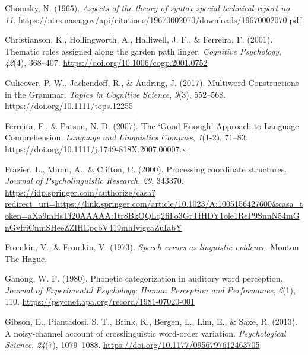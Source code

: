 \documentclass[
  12pt,
]{scrartcl}
\newlength{\cslhangindent}
\newenvironment{CSLReferences}[2] %
 {\begin{list}{}{%
  \setlength{\itemindent}{0pt}
  \setlength{\leftmargin}{0pt}
  \setlength{\parsep}{0pt}
  \ifodd #1
   \setlength{\leftmargin}{\cslhangindent}
   \setlength{\itemindent}{-1\cslhangindent}
  \fi
  \setlength{\itemsep}{#2\baselineskip}}}
 {\end{list}}
\begin{document}
\begin{CSLReferences}{1}{0}
Chomsky, N. (1965). \emph{Aspects of the theory of syntax special
technical report no. 11}.
\url{https://ntrs.nasa.gov/api/citations/19670002070/downloads/19670002070.pdf}

Christianson, K., Hollingworth, A., Halliwell, J. F., \& Ferreira, F.
(2001). Thematic roles assigned along the garden path linger.
\emph{Cognitive Psychology}, \emph{42}(4), 368--407.
\url{https://doi.org/10.1006/cogp.2001.0752}

Culicover, P. W., Jackendoff, R., \& Audring, J. (2017). Multiword
Constructions in the Grammar. \emph{Topics in Cognitive Science},
\emph{9}(3), 552--568. \url{https://doi.org/10.1111/tops.12255}

Ferreira, F., \& Patson, N. D. (2007). The {`}Good Enough{'} Approach to
Language Comprehension. \emph{Language and Linguistics Compass},
\emph{1}(1-2), 71--83.
\url{https://doi.org/10.1111/j.1749-818X.2007.00007.x}

Frazier, L., Munn, A., \& Clifton, C. (2000). Processing coordinate
structures. \emph{Journal of Psycholinguistic Research}, \emph{29},
343370.
\url{https://idp.springer.com/authorize/casa?redirect_uri=https://link.springer.com/article/10.1023/A:1005156427600&casa_token=aXa9mHsTf20AAAAA:1tr8BkQQLq2fiFo3GrTfHDY1ole1ReP9SnnN54mGnGvfriCnmSHeeZZIHEpcbV419mhIvigcaZuIabY}

Fromkin, V., \& Fromkin, V. (1973). \emph{Speech errors as linguistic
evidence}. Mouton The Hague.

Ganong, W. F. (1980). Phonetic categorization in auditory word
perception. \emph{Journal of Experimental Psychology: Human Perception
and Performance}, \emph{6}(1), 110.
\url{https://psycnet.apa.org/record/1981-07020-001}

Gibson, E., Piantadosi, S. T., Brink, K., Bergen, L., Lim, E., \& Saxe,
R. (2013). A noisy-channel account of crosslinguistic word-order
variation. \emph{Psychological Science}, \emph{24}(7), 1079--1088.
\url{https://doi.org/10.1177/0956797612463705}


\end{CSLReferences}
\end{document}
